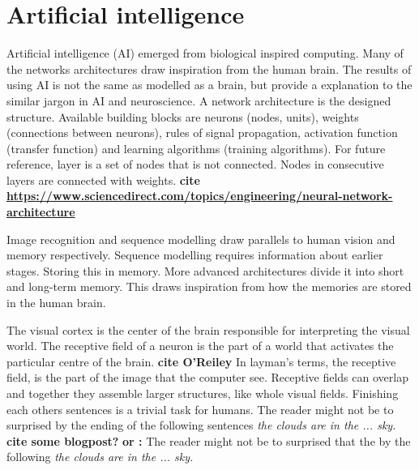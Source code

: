 \documentclass{article}
\begin{document}
\section{Artificial intelligence}
Artificial intelligence (AI) emerged from biological inspired computing. Many of the networks architectures draw inspiration from the human brain. The results of using AI is not the same as modelled as a brain, but provide a explanation to the similar jargon in AI and neuroscience. A network architecture is the designed structure. Available building blocks are neurons (nodes, units), weights (connections between neurons), rules of signal propagation, activation function (transfer function) and learning algorithms (training algorithms). For future reference, layer is a set of nodes that is not connected. Nodes in consecutive layers are connected with weights. \textbf{cite \href{https://www.sciencedirect.com/topics/engineering/neural-network-architecture}{\textbf{https://www.sciencedirect.com/topics/engineering/neural-network-architecture}}}

Image recognition and sequence modelling draw parallels to human vision and memory respectively. Sequence modelling requires information about earlier stages. Storing this in memory. More advanced architectures divide it into short and long-term memory. This draws inspiration from how the memories are stored in the human brain. 

The visual cortex is the center of the brain responsible for interpreting the visual world. The receptive field of a neuron is the part of a world that activates the particular centre of the brain. \textbf{cite O'Reiley} In layman's terms, the receptive field, is the part of the image that the computer see. Receptive fields can overlap and together they assemble larger structures, like whole visual fields. Finishing each others sentences is a trivial task for humans. The reader might not be to surprised by the ending of the following sentences \textit{the clouds are in the ... sky.} \textbf{cite some blogpost?} \textbf{or :}  The reader might not be to surprised that the by the following \textit{the clouds are in the ... sky.}
\end{document}

